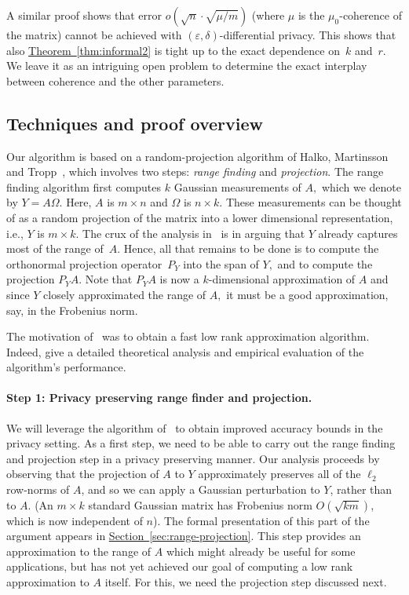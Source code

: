 \documentclass[letterpaper,11pt]{article}
\theoremstyle{definition}
\newcommand{\sectionref}[1]{\hyperref[sec:#1]{Section~\ref{sec:#1}}}
\newcommand{\theoremref}[1]{\hyperref[thm:#1]{Theorem~\ref{thm:#1}}}
\renewcommand{\epsilon}{\varepsilon}
\begin{document}
A similar proof shows that error $o(\sqrt{n}\cdot \sqrt{\mu/m})$ (where $\mu$
is the $\mu_0$-coherence of the matrix) cannot be achieved with
$(\epsilon,\delta)$-differential privacy. This shows that also
\theoremref{informal2} is tight up to the exact dependence on~$k$ and~$r.$ We
leave it as an intriguing open problem to determine the exact interplay
between coherence and the other parameters.





\subsection{Techniques and proof overview}
Our algorithm is based on a random-projection algorithm of Halko, Martinsson
and Tropp~\cite{HalkoMT11},
which involves two steps: \emph{range finding} and \emph{projection}. The
range finding algorithm first computes $k$ Gaussian measurements of $A,$ which
we denote by $Y=A\Omega.$ Here, $A$ is $m\times n$ and $\Omega$ is $n\times
k.$ These measurements can be thought of as a random projection of the matrix
into a lower dimensional representation, i.e., $Y$ is $m\times k.$ The crux of
the analysis in~\cite{HalkoMT11} is in arguing that $Y$ already captures most
of the range of~$A.$ Hence, all that remains to be done is to compute the
orthonormal projection operator~$P_Y$ into the span of $Y,$ and to compute the
projection $P_YA.$ Note that $P_YA$ is now a $k$-dimensional approximation of
$A$ and since $Y$ closely approximated the range of $A,$ it must be a good
approximation, say, in the Frobenius norm.

The motivation of~\cite{HalkoMT11} was to obtain a fast low rank approximation
algorithm. Indeed, \cite{HalkoMT11} give a detailed theoretical analysis and
empirical evaluation of the algorithm's performance.

\paragraph{Step 1: Privacy preserving range finder and projection.}
We will leverage the algorithm of~\cite{HalkoMT11} to obtain improved accuracy
bounds in the privacy setting. As a first step, we need to be able to carry out
the range finding and projection step in a privacy preserving manner.
Our analysis proceeds by observing that the projection of
$A$ to $Y$ approximately preserves all of the $\ell_2$ row-norms of $A$, and
so we can apply a Gaussian perturbation to $Y$, rather than to $A$. (An
$m\times k$ standard Gaussian matrix has Frobenius norm $O(\sqrt{km})$,
which is now independent of $n$). The formal presentation of this part of the
argument appears in \sectionref{range-projection}. This step provides an
approximation to the range of $A$ which might already be useful for some applications,
but has not yet achieved our goal of computing a low rank approximation to $A$
itself. For this, we need the projection step discussed next.
\end{document}
